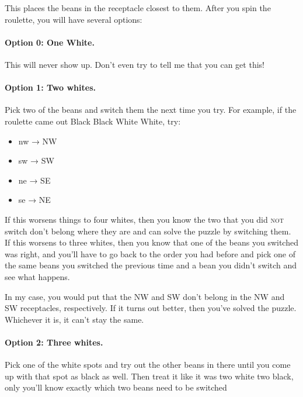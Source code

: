 \documentclass[11pt]{report}
\providecommand{\tightlist}{%
  \setlength{\itemsep}{0pt}\setlength{\parskip}{0pt}}
\let\oldparagraph\paragraph
\renewcommand{\paragraph}[1]{\oldparagraph{#1}\mbox{}\nopagebreak}
\newcommand\textlcsc[1]{\texorpdfstring{\textsc{\MakeLowercase{#1}}}{#1}}
\begin{document}
This places the beans in the receptacle closest to them. After you spin
the roulette, you will have several options:

\paragraph{Option 0: One White.} This will never show up. Don't even try to
tell me that you can get this!

\paragraph{Option 1: Two whites.} Pick two of the beans and switch them the
next time you try. For example, if the roulette came out Black Black White
White, try:%
%
\begin{itemize}
\tightlist
\item
  nw → NW
\item
  sw → SW
\item
  ne → SE
\item
  se → NE
\end{itemize}

If this worsens things to four whites, then you know the two that you did
\textlcsc{NOT} switch don't belong where they are and can solve the puzzle by
switching them. If this worsens to three whites, then you know that one of
the beans you switched was right, and you'll have to go back to the order you
had before and pick one of the same beans you switched the previous time and
a bean you didn't switch and see what happens.

In my case, you would put that the NW and SW don't belong in the NW and SW
receptacles, respectively. If it turns out better, then you've solved the
puzzle. Whichever it is, it can't stay the same.

\paragraph{Option 2: Three whites.} Pick one of the white spots and try out
the other beans in there until you come up with that spot as black as
well. Then treat it like it was two white two black, only you'll know exactly
which two beans need to be switched
\end{document}
